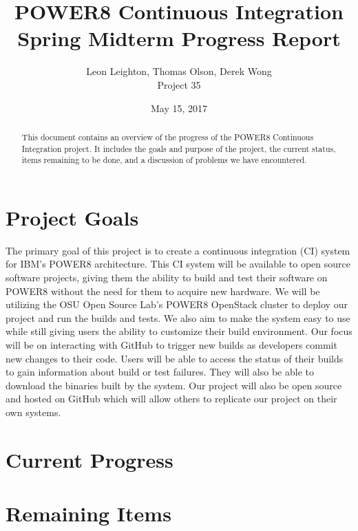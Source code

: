\documentclass[10pt,onecolumn,journal,draftclsnofoot]{IEEEtran}
\begin{document}
\begin{titlepage}
  \title{POWER8 Continuous Integration\\ Spring Midterm Progress Report}
  \author{Leon Leighton, Thomas Olson, Derek Wong\\Project 35}
  \date{May 15, 2017}
  \maketitle
  \vspace{4cm}
  \begin{abstract}
  \noindent This document contains an overview of the progress of the POWER8 Continuous Integration project.
    It includes the goals and purpose of the project, the current status, items remaining to be done, 
    and a discussion of problems we have encountered. 
 \end{abstract}
\end{titlepage}

\tableofcontents
\clearpage

\section{Project Goals}
The primary goal of this project is to create a continuous integration (CI) system for IBM's POWER8 architecture.
This CI system will be available to open source software projects, giving them the ability to build and test their software on POWER8 without the need for them to acquire new hardware.
We will be utilizing the OSU Open Source Lab's POWER8 OpenStack cluster to deploy our project and run the builds and tests.
We also aim to make the system easy to use while still giving users the ability to customize their build environment.
Our focus will be on interacting with GitHub to trigger new builds as developers commit new changes to their code.
Users will be able to access the status of their builds to gain information about build or test failures.
They will also be able to download the binaries built by the system.
Our project will also be open source and hosted on GitHub which will allow others to replicate our project on their own systems.

\section{Current Progress}

\section{Remaining Items}
\end{document}
